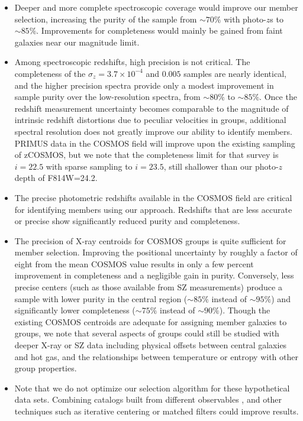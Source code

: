 \begin{itemize}
\item{Deeper and more complete spectroscopic coverage would improve our member
    selection, increasing the purity of the sample from $\sim70\%$
    with photo-$z$s to
    $\sim85\%$. Improvements for completeness would mainly be gained
    from faint galaxies near our magnitude limit.}
\item{Among spectroscopic redshifts, high precision is not
    critical. The completeness of the $\sigma_z=3.7\times10^{-4}$ and
    $0.005$ samples are nearly identical, and the higher precision
    spectra provide only a modest improvement in sample purity over
    the low-resolution spectra, from
    $\sim80\%$ to $\sim85\%$. Once the redshift measurement
    uncertainty becomes comparable to the magnitude of intrinsic
    redshift distortions due to peculiar velocities in groups,
    additional spectral resolution does not greatly improve our ability to
    identify members. PRIMUS data in the COSMOS field will improve
    upon the existing sampling of zCOSMOS, but we note that the completeness
    limit for that survey is $i=22.5$ with sparse sampling to
    $i=23.5$, still shallower than our photo-$z$ depth of F814W=24.2.}
\item{The precise photometric redshifts available in the COSMOS field
    are critical for identifying members using our approach. Redshifts
    that are less accurate or precise show significantly reduced purity
    and completeness.}
\item{The precision of X-ray centroids for COSMOS groups is quite
    sufficient for member selection. Improving the positional
    uncertainty by roughly a factor of eight from the mean COSMOS
    value results in only a few percent improvement in completeness
    and a negligible gain in purity. Conversely, less precise centers
    (such as those available from SZ measurements) produce a sample
    with lower purity in the central region ($\sim85\%$ instead of
    $\sim95\%$) and significantly lower completeness ($\sim75\%$
    instead of $\sim90\%$). Though the existing COSMOS centroids are
    adequate for assigning member galaxies to groups, we note that
    several aspects of groups could still be studied with deeper X-ray
    or SZ data including physical offsets between central galaxies and
    hot gas, and the relationships between temperature or entropy with
    other group properties.}
\item{Note that we do not optimize our selection algorithm for these
    hypothetical data sets. Combining catalogs built from different
    observables \citep[e.g.,][]{Cohn2009}, and other techniques such
    as iterative centering or matched filters could improve results.}
\end{itemize}

